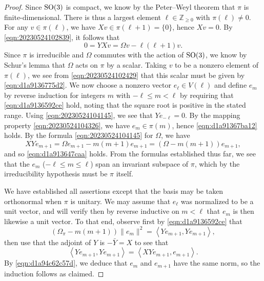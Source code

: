 \documentclass[reqno]{amsart} 
\numberwithin{equation}{section}
\begin{document}
\begin{proof}
  Since $\operatorname{SO}(3)$ is compact, we know by the Peter--Weyl theorem that $\pi$ is finite-dimensional.  There is thus a largest element $\ell \in \mathbb{Z}_{\geq 0}$ with $\pi(\ell) \neq 0$.  For any $v \in \pi(\ell)$, we have $X v \in \pi(\ell+1) = \{0\}$, hence $X v = 0$.  By \eqref{eqn:20230524102839}, it follows that
  \begin{equation}\label{eqn:20230524102429}
    0 = Y X v = \Omega v - \ell (\ell + 1) v.
  \end{equation}
  Since $\pi$ is irreducible and $\Omega$ commutes with the action of $\operatorname{SO}(3)$, we know by Schur's lemma that $\Omega$ acts on $\pi$ by a scalar.  Taking $v$ to be a nonzero element of $\pi(\ell)$, we see from \eqref{eqn:20230524102429} that this scalar must be given by \eqref{eqn:d1a9136775d2}.  We now choose a nonzero vector $e_{\ell} \in V(\ell)$ and define $e_m$ by reverse induction for integers $m$ with $- \ell \leq m < \ell$ by requiring that \eqref{eqn:d1a9136592ce} hold, noting that the square root is positive in the stated range.  Using \eqref{eqn:20230524104145}, we see that $Y e_{- \ell} = 0$.  By the mapping property \eqref{eqn:20230524104326}, we have $e_m \in \pi(m)$, hence \eqref{eqn:d1a91367ba12} holds.  By the formula \eqref{eqn:20230524104145} for $\Omega$, we have
  \begin{equation}\label{eqn:d1a94c62c57d}
    X Y e_{m + 1} = \Omega e_{m+1} - m(m+1) e_{m+1}
    =
    (\Omega - m (m + 1)) e_{m+1},
  \end{equation}
  and so \eqref{eqn:d1a913647caa} holds.  From the formulas established thus far, we see that the $e_m$ ($- \ell \leq m \leq \ell$) span an invariant subspace of $\pi$, which by the irreducibility hypothesis must be $\pi$ itself.

  We have established all assertions except that the basis may be taken orthonormal when $\pi$ is unitary.  We may assume that $e_{\ell}$ was normalized to be a unit vector, and will verify then by reverse inductive on $m < \ell$ that $e_m$ is then likewise a unit vector.  To that end, observe first by \eqref{eqn:d1a9136592ce} that
  \begin{equation*}
    (\Omega_\pi - m(m+1))
    \lVert e_{m} \rVert^2
    = \left\langle Y e_{m + 1}, Y e_{m+1} \right\rangle,
  \end{equation*}
  then use that the adjoint of $Y$ is $- \bar{Y} = X$ to see that
  \begin{equation*}
    \left\langle Y e_{m + 1}, Y e_{m+1} \right\rangle
    =
    \left\langle X Y e_{m + 1}, e_{m+1} \right\rangle.
  \end{equation*}
  By \eqref{eqn:d1a94c62c57d}, we deduce that $e_m$ and $e_{m + 1}$ have the same norm, so the induction follows as claimed.
\end{proof}
\end{document}
